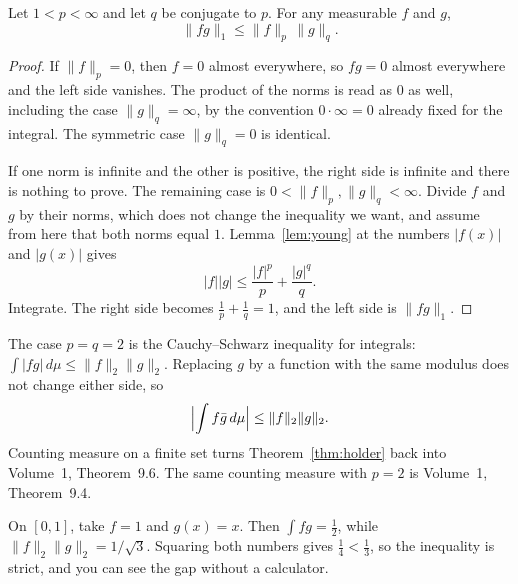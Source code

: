 \begin{theorem}\label{thm:holder}
Let $1<p<\infty$ and let $q$ be conjugate to $p$. For any measurable $f$ and $g$,
\[\|fg\|_1\le\|f\|_p\,\|g\|_q.\]
\end{theorem}
\begin{proof}
If $\|f\|_p=0$, then $f=0$ almost everywhere, so $fg=0$ almost everywhere and the left side vanishes. The product of the norms is read as $0$ as well, including the case $\|g\|_q=\infty$, by the convention $0\cdot\infty=0$ already fixed for the integral. The symmetric case $\|g\|_q=0$ is identical.

If one norm is infinite and the other is positive, the right side is infinite and there is nothing to prove. The remaining case is $0<\|f\|_p,\|g\|_q<\infty$. Divide $f$ and $g$ by their norms, which does not change the inequality we want, and assume from here that both norms equal $1$. Lemma~\ref{lem:young} at the numbers $|f(x)|$ and $|g(x)|$ gives
\[|f||g|\le\frac{|f|^p}p+\frac{|g|^q}q.\]
Integrate. The right side becomes $\frac1p+\frac1q=1$, and the left side is $\|fg\|_1$.
\end{proof}

The case $p=q=2$ is the Cauchy--Schwarz inequality for integrals: $\int|fg|\,d\mu\le\|f\|_2\|g\|_2$. Replacing $g$ by a function with the same modulus does not change either side, so
\[\Bigl|\int f\bar g\,d\mu\Bigr|\le\|f\|_2\|g\|_2.\]
Counting measure on a finite set turns Theorem~\ref{thm:holder} back into Volume~1, Theorem~9.6. The same counting measure with $p=2$ is Volume~1, Theorem~9.4.

On $[0,1]$, take $f=1$ and $g(x)=x$. Then $\int fg=\frac12$, while $\|f\|_2\|g\|_2=1/\sqrt3$. Squaring both numbers gives $\frac14<\frac13$, so the inequality is strict, and you can see the gap without a calculator.

